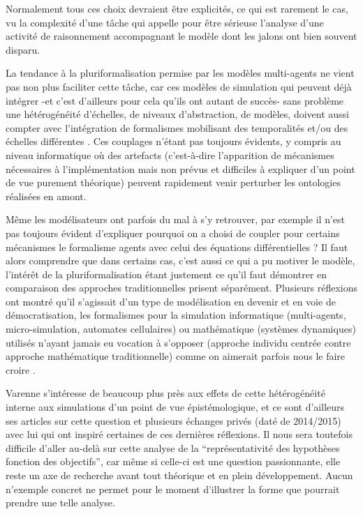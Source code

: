 Normalement tous ces choix devraient être explicités, ce qui est rarement le cas, vu la complexité d'une tâche qui appelle pour être sérieuse l'analyse d'une activité de raisonnement accompagnant le modèle dont les jalons ont bien souvent disparu.

La tendance à la pluriformalisation permise par les modèles multi-agents ne vient pas non plus faciliter cette tâche, car ces modèles de simulation qui peuvent déjà intégrer -et c'est d'ailleurs pour cela qu'ils ont autant de succès- sans problème une hétérogénéité d'échelles, de niveaux d'abstraction, de modèles, doivent aussi compter avec l'intégration de formalismes mobilisant des temporalités et/ou des échelles différentes \autocites{Varenne2008,Varenne2012a}. Ces couplages n'étant pas toujours évidents, y compris au niveau informatique où des artefacts (c'est-à-dire l'apparition de mécanismes nécessaires à l'implémentation mais non prévus et difficiles à expliquer d'un point de vue purement théorique) peuvent rapidement venir perturber les ontologies réalisées en amont.

Même les modélisateurs ont parfois du mal à s'y retrouver, par exemple il n'est pas toujours évident d'expliquer pourquoi on a choisi de coupler pour certains mécanismes le formalisme agents avec celui des équations différentielles ? Il faut alors comprendre que dans certains cas, c'est aussi ce qui a pu motiver le modèle, l'intérêt de la pluriformalisation étant justement ce qu'il faut démontrer en comparaison des approches traditionnelles prisent séparément. Plusieurs réflexions ont montré qu'il s'agissait d'un type de modélisation en devenir et en voie de démocratisation, les formalismes pour la simulation informatique (multi-agents, micro-simulation, automates cellulaires) ou mathématique (systèmes dynamiques) utilisés n'ayant jamais eu vocation à s'opposer (approche individu centrée contre approche mathématique traditionnelle) comme on aimerait parfois nous le faire croire \autocites{Sanders2013, Banos2013}.

Varenne s’intéresse de beaucoup plus près aux effets de cette hétérogénéité interne aux simulations d’un point de vue épistémologique, et ce sont d'ailleurs ses articles sur cette question \autocite{Varenne2013b,Varenne2013c} et plusieurs échanges privés (daté de 2014/2015) avec lui qui ont inspiré certaines de ces dernières réflexions. Il nous sera toutefois difficile d’aller au-delà sur cette analyse de la \enquote{représentativité des hypothèses fonction des objectifs}, car même si celle-ci est une question passionnante, elle reste un axe de recherche avant tout théorique et en plein développement. Aucun n'exemple concret ne permet pour le moment d'illustrer la forme que pourrait prendre une telle analyse.

